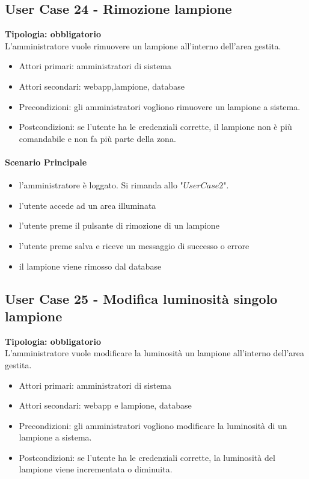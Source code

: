 \documentclass[12pt]{article}
\begin{document}
\subsection{User Case 24 - Rimozione lampione}
\textbf{Tipologia: obbligatorio}\\
L'amministratore vuole rimuovere un lampione all'interno dell'area gestita.
\begin{itemize}
	\item Attori primari: amministratori di sistema
	\item Attori secondari: webapp,lampione, database
	\item Precondizioni: gli amministratori vogliono rimuovere un lampione a sistema.\\
	\item Postcondizioni: se l'utente ha le credenziali corrette, il lampione non è più comandabile e non fa più parte della zona.
\end{itemize}
\paragraph{Scenario Principale}
\begin{itemize}
	\item l'amministratore è loggato. Si rimanda allo "$User Case 2$".
	\item l'utente accede ad un area illuminata
	\item l'utente preme il pulsante di rimozione di un lampione
	\item l'utente preme salva e riceve un messaggio di successo o errore
	\item il lampione viene rimosso dal database
\end{itemize}

\subsection{User Case 25 - Modifica luminosità singolo lampione}
\textbf{Tipologia: obbligatorio}\\
L'amministratore vuole modificare la luminosità un lampione all'interno dell'area gestita.
\begin{itemize}
	\item Attori primari: amministratori di sistema
	\item Attori secondari: webapp e lampione, database
	\item Precondizioni: gli amministratori vogliono modificare la luminosità di un lampione a sistema.\\
	\item Postcondizioni: se l'utente ha le credenziali corrette, la luminosità del lampione viene incrementata o diminuita.
\end{itemize}
\end{document}
